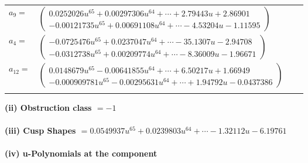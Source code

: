 \documentclass[1p]{elsarticle_modified}
\theoremstyle{definition}
\begin{document}
\begin{tabular}{m{7pt} m{180pt} m{7pt} m{180pt} }
\flushright $a_{9}=$&$\begin{pmatrix}0.0252026 u^{65}+0.00297306 u^{64}+\cdots+2.79443 u+2.86901\\-0.00121735 u^{65}+0.00691108 u^{64}+\cdots-4.53204 u-1.11595\end{pmatrix}$ \\
\flushright $a_{4}=$&$\begin{pmatrix}-0.0725476 u^{65}+0.0237047 u^{64}+\cdots-35.1307 u-2.94708\\-0.0312738 u^{65}+0.00209774 u^{64}+\cdots-8.36009 u-1.96671\end{pmatrix}$ \\
\flushright $a_{12}=$&$\begin{pmatrix}0.0148679 u^{65}-0.00641855 u^{64}+\cdots+6.50217 u+1.66949\\-0.000909781 u^{65}-0.00295631 u^{64}+\cdots+1.94792 u-0.0437386\end{pmatrix}$\\&\end{tabular}
\flushleft \textbf{(ii) Obstruction class $= -1$}\\~\\
\flushleft \textbf{(iii) Cusp Shapes $= 0.0549937 u^{65}+0.0239803 u^{64}+\cdots-1.32112 u-6.19761$}\\~\\
\newpage\renewcommand{\arraystretch}{1}
\flushleft \textbf{(iv) u-Polynomials at the component}\newline \\
\end{document}
